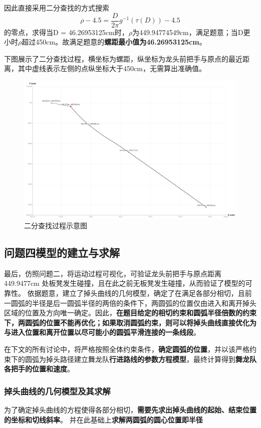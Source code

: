 \documentclass[a4paper]{article}
\begin{document}
        因此直接采用二分查找的方式搜索$$\rho -4.5 = \frac{D}{2 \pi} g^{-1}(\tau(D)) - 4.5$$的零点，求得当D = 46.26953125cm时，$\rho$为449.94774549cm，满足题意；当D更小时$\rho$超过450cm。故满足题意的\textbf{螺距最小值为46.26953125cm}。

        下图展示了二分查找过程，横坐标为螺距，纵坐标为龙头前把手与原点的最近距离，其中虚线表示左侧的点纵坐标大于450cm，无需算出准确值。
 \begin{figure}[h]
     \centering
     \includegraphics[width=0.5\linewidth]{image/search_3.png}
     \caption{二分查找过程示意图}
     \label{fig:enter-label}
 \end{figure}
	\subsection{问题四模型的建立与求解}
最后，仿照问题二，将运动过程可视化，可验证龙头前把手与原点距离 449.9477cm 处板凳发生碰撞，且在此之前无板凳发生碰撞，从而验证了模型的可靠性。
		依据题意，建立了掉头曲线的几何模型，确定了在满足各部分相切，且前一圆弧的半径是后一圆弧半径的两倍的条件下，两圆弧的位置仅由进入和离开掉头区域的位置及方向唯一确定。因此，\textbf{在题目给定的相切约束和圆弧半径倍数的约束下，两圆弧的位置不能再优化；如果取消圆弧约束，则可以将掉头曲线直接优化为与进入位置和离开位置以尽可能小的圆弧平滑连接的一条线段}。

        在下文的所有讨论中，将严格按照全体约束条件，\textbf{确定圆弧的位置}，并以该严格约束下的圆弧为掉头路径建立舞龙队\textbf{行进路线的参数方程模型}，最终计算得到\textbf{舞龙队各把手的位置和速度}。%

		\subsubsection{掉头曲线的几何模型及其求解}

		为了确定掉头曲线的方程使得各部分相切，\textbf{需要先求出掉头曲线的起始、结束位置的坐标和切线斜率}。
		并在此基础上\textbf{求解两圆弧的圆心位置即半径}
\end{document}
